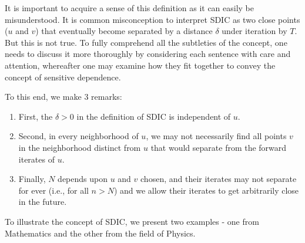 \documentclass[a4paper,12pt,twoside]{report}
\begin{document}
It is important to acquire a sense of this definition as it can easily be misunderstood. It is common misconception to interpret SDIC as two close points ($u$ and $v$) that eventually become separated by a distance $\delta$ under iteration by $T$. But this is not true. To fully comprehend all the subtleties of the concept, one needs to discuss it more thoroughly by considering each sentence with care and attention, whereafter one may examine how they fit together to convey the concept of sensitive dependence. 

To this end, we make 3 remarks:
\vspace{-5mm}
\begin{enumerate}
  \item First, the $\delta>0$ in the definition of SDIC is independent of $u$. 
  \item Second, in every neighborhood of $u$, we may not necessarily find all points $v$ in the neighborhood distinct from $u$ that would separate from the forward iterates of $u$. 
  \item  Finally, $N$ depends upon $u$ and $v$ chosen, and their iterates may not separate for ever (i.e., for all $n>N$) and we allow their iterates to get arbitrarily close in the future. 
\end{enumerate}

To illustrate the concept of SDIC, we present two examples - one from Mathematics and the other from the field of Physics.
\end{document}
